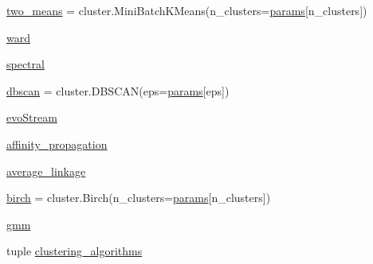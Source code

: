\begin{DoxyCompactItemize}
\hyperlink{namespaceStreamClusteringAlgorithms_1_1evoStream_1_1v1_1_1Tests_1_1plot__cluster__comparison_ac516faeccd52185be37b014b5ed64f74}{two\+\_\+means} = cluster.\+Mini\+Batch\+K\+Means(n\+\_\+clusters=\hyperlink{namespaceStreamClusteringAlgorithms_1_1evoStream_1_1v1_1_1Tests_1_1plot__cluster__comparison_a57eaaa643ce4ca6f93e037fd8a49db07}{params}\mbox{[}\textquotesingle{}n\+\_\+clusters\textquotesingle{}\mbox{]})
\item 
\hyperlink{namespaceStreamClusteringAlgorithms_1_1evoStream_1_1v1_1_1Tests_1_1plot__cluster__comparison_a5e3d713b5270334577f9e60138088495}{ward}
\item 
\hyperlink{namespaceStreamClusteringAlgorithms_1_1evoStream_1_1v1_1_1Tests_1_1plot__cluster__comparison_a16fb613b326d3c108d8467f7838bf678}{spectral}
\item 
\hyperlink{namespaceStreamClusteringAlgorithms_1_1evoStream_1_1v1_1_1Tests_1_1plot__cluster__comparison_a6cb0df1eaf8a3f9e38336949b597d31a}{dbscan} = cluster.\+D\+B\+S\+C\+AN(eps=\hyperlink{namespaceStreamClusteringAlgorithms_1_1evoStream_1_1v1_1_1Tests_1_1plot__cluster__comparison_a57eaaa643ce4ca6f93e037fd8a49db07}{params}\mbox{[}\textquotesingle{}eps\textquotesingle{}\mbox{]})
\item 
\hyperlink{namespaceStreamClusteringAlgorithms_1_1evoStream_1_1v1_1_1Tests_1_1plot__cluster__comparison_a3df8dee08ceace35d5ffd544558f1b07}{evo\+Stream}
\item 
\hyperlink{namespaceStreamClusteringAlgorithms_1_1evoStream_1_1v1_1_1Tests_1_1plot__cluster__comparison_a760367d8093047a63ad6167b40d8d9a2}{affinity\+\_\+propagation}
\item 
\hyperlink{namespaceStreamClusteringAlgorithms_1_1evoStream_1_1v1_1_1Tests_1_1plot__cluster__comparison_a718f9e8619d1d210b7cc7c3d969e4a33}{average\+\_\+linkage}
\item 
\hyperlink{namespaceStreamClusteringAlgorithms_1_1evoStream_1_1v1_1_1Tests_1_1plot__cluster__comparison_ae677d2ea4f3fa5702af181bdbf39ab5a}{birch} = cluster.\+Birch(n\+\_\+clusters=\hyperlink{namespaceStreamClusteringAlgorithms_1_1evoStream_1_1v1_1_1Tests_1_1plot__cluster__comparison_a57eaaa643ce4ca6f93e037fd8a49db07}{params}\mbox{[}\textquotesingle{}n\+\_\+clusters\textquotesingle{}\mbox{]})
\item 
\hyperlink{namespaceStreamClusteringAlgorithms_1_1evoStream_1_1v1_1_1Tests_1_1plot__cluster__comparison_a116e8d4ebc2b7d6e466ee3370454d582}{gmm}
\item 
tuple \hyperlink{namespaceStreamClusteringAlgorithms_1_1evoStream_1_1v1_1_1Tests_1_1plot__cluster__comparison_a8b3da332a7f1ce017faf667ad24965ee}{clustering\+\_\+algorithms}

\end{DoxyCompactItemize}
